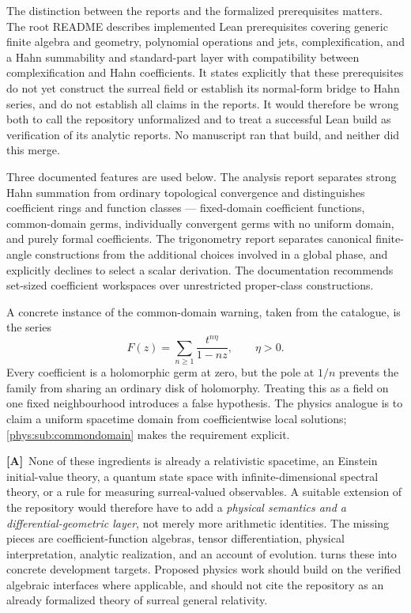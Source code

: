 \documentclass[11pt,letterpaper]{article}
\numberwithin{equation}{section}
\theoremstyle{definition}
\theoremstyle{remark}
\newcommand{\TA}{\textcolor{TierA}{\textsf{\bfseries[A]}}}
\begin{document}
The distinction between the reports and the formalized prerequisites matters.
The root README describes implemented Lean prerequisites covering generic
finite algebra and geometry, polynomial operations and jets, complexification,
and a Hahn summability and standard-part layer with compatibility between
complexification and Hahn coefficients. It states explicitly that these
prerequisites do not yet construct the surreal field or establish its
normal-form bridge to Hahn series, and do not establish all claims in the
reports. It would therefore be wrong both to call the repository unformalized
and to treat a successful Lean build as verification of its analytic reports.
No manuscript ran that build, and neither did this merge.

Three documented features are used below. The analysis report separates strong
Hahn summation from ordinary topological convergence and distinguishes
coefficient rings and function classes --- fixed-domain coefficient functions,
common-domain germs, individually convergent germs with no uniform domain, and
purely formal coefficients. The trigonometry report separates canonical
finite-angle constructions from the additional choices involved in a global
phase, and explicitly declines to select a scalar derivation. The documentation
recommends set-sized coefficient workspaces over unrestricted proper-class
constructions.

A concrete instance of the common-domain warning, taken from the catalogue,
is the series
\begin{equation}\label{phys:eq:nocommondisk}
F(z)=\sum_{n\ge1}\frac{t^{n\eta}}{1-nz},\qquad \eta>0.
\end{equation}
Every coefficient is a holomorphic germ at zero, but the pole at $1/n$ prevents
the family from sharing an ordinary disk of holomorphy. Treating this as a
field on one fixed neighbourhood introduces a false hypothesis. The physics
analogue is to claim a uniform spacetime domain from coefficientwise local
solutions; \cref{phys:sub:commondomain} makes the requirement explicit.

\TA\ None of these ingredients is already a relativistic spacetime, an Einstein
initial-value theory, a quantum state space with infinite-dimensional spectral
theory, or a rule for measuring surreal-valued observables. A suitable
extension of the repository would therefore have to add a \emph{physical
semantics and a differential-geometric layer}, not merely more arithmetic
identities. The missing pieces are coefficient-function algebras, tensor
differentiation, physical interpretation, analytic realization, and an account
of evolution.  turns these into concrete development
targets. Proposed physics work should build on the verified algebraic
interfaces where applicable, and should not cite the repository as an already
formalized theory of surreal general relativity.
\end{document}
